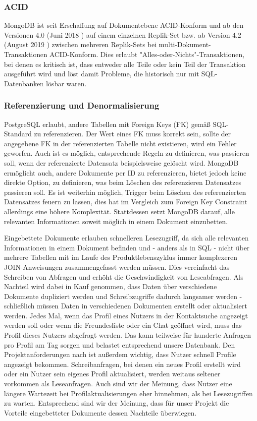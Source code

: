 \subsubsection{ACID}
 MongoDB ist seit Erschaffung auf Dokumentebene ACID-Konform und ab den Versionen 4.0 (Juni 2018 \cite{MG8}) auf einem einzelnen Replik-Set bzw. ab Version 4.2 (August 2019 \cite{MG8}) zwischen mehreren Replik-Sets bei multi-Dokument-Transaktionen ACID-Konform. \cite{MG6} Dies erlaubt "Alles-oder-Nichts"-Transaktionen, bei denen es kritisch ist, dass entweder alle Teile oder kein Teil der Transaktion ausgeführt wird und löst damit Probleme, die historisch nur mit SQL-Datenbanken lösbar waren.

\subsubsection{Referenzierung und Denormalisierung}
PostgreSQL erlaubt, andere Tabellen mit Foreign Keys (FK) gemäß SQL-Standard zu referenzieren. Der Wert eines FK muss korrekt sein, sollte der angegebene FK in der referenzierten Tabelle nicht existieren, wird ein Fehler geworfen. Auch ist es möglich, entsprechende Regeln zu definieren, was passieren soll, wenn der referenzierte Datensatz beispielsweise gelöscht wird.
MongoDB ermöglicht auch, andere Dokumente per ID zu referenzieren, bietet jedoch keine direkte Option, zu definieren, was beim Löschen des referenzieren Datensatzes passieren soll. Es ist weiterhin möglich, Trigger beim Löschen des referenzierten Datensatzes feuern zu lassen, dies hat im Vergleich zum Foreign Key Constraint allerdings eine höhere Komplexität. Stattdessen setzt MongoDB darauf, alle relevanten Informationen soweit möglich in einem Dokument einzubetten.

Eingebettete Dokumente erlauben schnelleren Lesezugriff, da sich alle relevanten Informationen in einem Dokument befinden und - anders als in SQL - nicht über mehrere Tabellen mit im Laufe des Produktlebenszyklus immer komplexeren JOIN-Anweisungen zusammengefasst werden müssen. Dies vereinfacht das Schreiben von Abfragen und erhöht die Geschwindigkeit von Leseabfragen. Als Nachteil wird dabei in Kauf genommen, dass Daten über verschiedene Dokumente dupliziert werden und Schreibzugriffe dadurch langsamer werden - schließlich müssen Daten in verschiedenen Dokumenten erstellt oder aktualisiert werden. 
Jedes Mal, wenn das Profil eines Nutzers in der Kontaktsuche angezeigt werden soll oder wenn die Freundesliste oder ein Chat geöffnet wird, muss das Profil dieses Nutzers abgefragt werden. Das kann teilweise für hunderte Anfragen pro Profil am Tag sorgen und belastet entsprechend unsere Datenbank. Den Projektanforderungen nach ist außerdem wichtig, dass Nutzer schnell Profile angezeigt bekommen. Schreibanfragen, bei denen ein neues Profil erstellt wird oder ein Nutzer sein eigenes Profil aktualisiert, werden weitaus seltener vorkommen als Leseanfragen. Auch sind wir der Meinung, dass Nutzer eine längere Wartezeit bei Profilaktualisierungen eher hinnehmen, als bei Lesezugriffen zu warten.
Entsprechend sind wir der Meinung, dass für unser Projekt die Vorteile eingebetteter Dokumente dessen Nachteile überwiegen.

